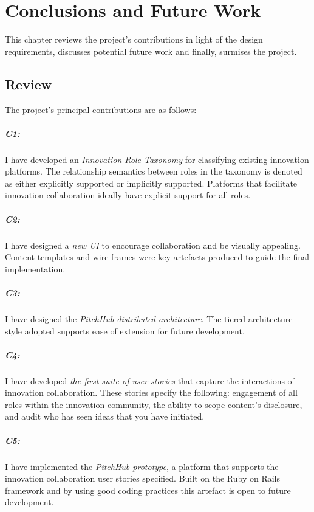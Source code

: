 \chapter{Conclusions and Future Work}
This chapter reviews the project's contributions in light of the design requirements, discusses potential future work and finally, surmises the project.

\section{Review}

The project's principal contributions are as follows:

\paragraph{C1:} I have developed an {\em Innovation Role Taxonomy} for classifying existing innovation platforms. The relationship semantics between roles in the taxonomy is denoted as either explicitly supported or implicitly supported. Platforms that facilitate innovation collaboration ideally have explicit support for all roles.

\paragraph{C2:} I have designed a {\em new UI} to encourage collaboration and be visually appealing. Content templates and wire frames were key artefacts produced to guide the final implementation.

\paragraph{C3:} I have designed the {\em PitchHub distributed architecture}. The tiered architecture style adopted supports ease of extension for future development.

\paragraph{C4:} I have developed {\em the first suite of user stories} that capture the interactions of innovation collaboration. These stories specify the following: engagement of all roles within the innovation community, the ability to scope content's disclosure, and audit who has seen ideas that you have initiated.

\paragraph{C5:} I have implemented the {\em PitchHub prototype}, a platform that supports the innovation collaboration user stories specified. Built on the Ruby on Rails framework and by using good coding practices this artefact is open to future development.

